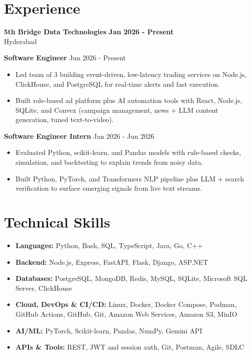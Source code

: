 \documentclass[a4paper,11pt]{article}
\newcommand{\resumeItem}[1]{\item \small{#1}}
\newcommand{\resumeSubheading}[4]{%
  \textbf{#1} \hfill \textbf{#2} \\
{#3} \hfill {#4}
}
\newcommand{\resumeSubHeadingListStart}{\begin{itemize}}
\newcommand{\resumeSubHeadingListEnd}{\end{itemize}}
\begin{document}
\section*{Experience}

\resumeSubheading
{5th Bridge Data Technologies}{Jan 2026 - Present}
{Hyderabad}{}

\textbf{Software Engineer} \hfill {Jun 2026 - Present}
\resumeSubHeadingListStart
\resumeItem{Led team of 3 building event-driven, low-latency trading services on Node.js, ClickHouse, and PostgreSQL for real-time alerts and fast execution.}
\resumeItem{Built role-based ad platform plus AI automation tools with React, Node.js, SQLite, and Convex (campaign management, news + LLM content generation, tuned text-to-video).}
\resumeSubHeadingListEnd

\textbf{Software Engineer Intern} \hfill {Jan 2026 - Jun 2026}
\resumeSubHeadingListStart
\resumeItem{Evaluated Python, scikit-learn, and Pandas models with rule-based checks, simulation, and backtesting to explain trends from noisy data.}
\resumeItem{Built Python, PyTorch, and Transformers NLP pipeline plus LLM + search verification to surface emerging signals from live text streams.}
\resumeSubHeadingListEnd


\section*{Technical Skills}
\begin{itemize}
\item \textbf{Languages:} Python, Bash, SQL, TypeScript, Java, Go, C++
\item \textbf{Backend:} Node.js, Express, FastAPI, Flask, Django, ASP.NET
\item \textbf{Databases:} PostgreSQL, MongoDB, Redis, MySQL, SQLite, Microsoft SQL Server, ClickHouse
\item \textbf{Cloud, DevOps \& CI/CD:} Linux, Docker, Docker Compose, Podman, GitHub Actions, GitHub, Git, Amazon Web Services, Amazon S3, MinIO
\item \textbf{AI/ML:} PyTorch, Scikit-learn, Pandas, NumPy, Gemini API
\item \textbf{APIs \& Tools:} REST, JWT and session auth, Git, Postman, Agile, SDLC
\end{itemize}
\end{document}
